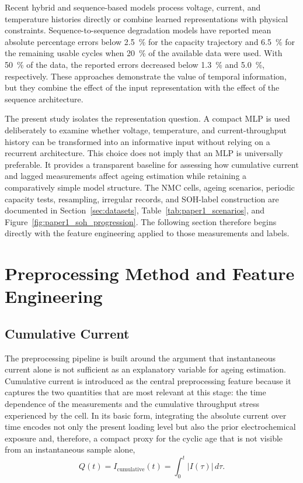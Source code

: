 \documentclass[
    a4paper,
    12pt,
    titlepage,
    bibliography=totoc,
    twoside=on,
    parskip=false,
    numbers=noenddot,
    cleardoublepage=empty,
    DIV=12,
    BCOR=12.0mm,
    headheight=36pt,
    headings=openright
]{scrreprt}
\begin{document}
Recent hybrid and sequence-based models process voltage, current, and temperature histories directly or combine learned representations with physical constraints. Sequence-to-sequence degradation models have reported mean absolute percentage errors below \SI{2.5}{\percent} for the capacity trajectory and \SI{6.5}{\percent} for the remaining usable cycles when \SI{20}{\percent} of the available data were used. With \SI{50}{\percent} of the data, the reported errors decreased below \SI{1.3}{\percent} and \SI{5.0}{\percent}, respectively.\autocite{xuNovelHybridPhysicsBased2023,pangPhysicsinformedNeuralNetwork2023,kimEstimationLiionBattery2018,chaouiAgingPredictionState2017} These approaches demonstrate the value of temporal information, but they combine the effect of the input representation with the effect of the sequence architecture.

The present study isolates the representation question. A compact MLP is used deliberately to examine whether voltage, temperature, and current-throughput history can be transformed into an informative input without relying on a recurrent architecture. This choice does not imply that an MLP is universally preferable. It provides a transparent baseline for assessing how cumulative current and lagged measurements affect ageing estimation while retaining a comparatively simple model structure. The NMC cells, ageing scenarios, periodic capacity tests, resampling, irregular records, and SOH-label construction are documented in Section~\ref{sec:datasets}, Table~\ref{tab:paper1_scenarios}, and Figure~\ref{fig:paper1_soh_progression}. The following section therefore begins directly with the feature engineering applied to those measurements and labels.

\section{Preprocessing Method and Feature Engineering}
\subsection{Cumulative Current}
The preprocessing pipeline is built around the argument that instantaneous current alone is not sufficient as an explanatory variable for ageing estimation. Cumulative current is introduced as the central preprocessing feature because it captures the two quantities that are most relevant at this stage: the time dependence of the measurements and the cumulative throughput stress experienced by the cell. In its basic form, integrating the absolute current over time encodes not only the present loading level but also the prior electrochemical exposure and, therefore, a compact proxy for the cyclic age that is not visible from an instantaneous sample alone,
\begin{equation}
Q(t) = I_{\mathrm{cumulative}}(t) = \int_{0}^{t} \lvert I(\tau) \rvert \, d\tau .
\end{equation}
\end{document}
